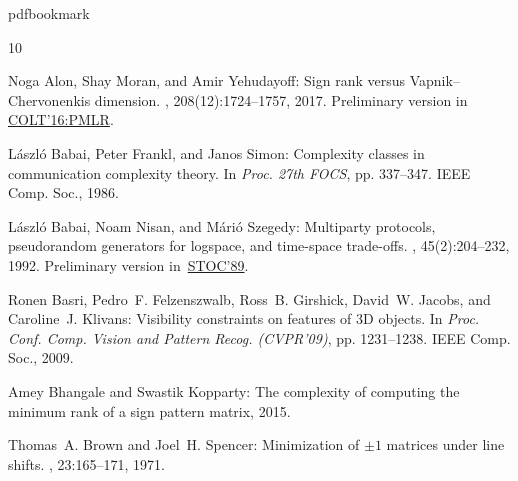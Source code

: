 \newcommand{\prelim}{Preliminary version in\ }\newcommand{\prelims}{Preliminary
  versions in\ }
\providecommand{\bibhead}[1]{}
\expandafter\ifx\csname pdfbookmark\endcsname\relax%
  \providecommand{\tocrefpdfbookmark}{}
\else\providecommand{\tocrefpdfbookmark}{%
   \hypertarget{tocreferences}{}%
   \pdfbookmark[1]{References}{tocreferences}}%
\fi

\tocrefpdfbookmark
\begin{thebibliography}{10}

\bibhead{alon2016sign}
{\sc Noga Alon, Shay Moran, and Amir Yehudayoff}: Sign rank versus
  {V}apnik--{C}hervonenkis dimension.
, 208(12):1724--1757, 2017.
\newblock \prelim
  \href{http://proceedings.mlr.press/v49/alon16.html}{COLT'16:PMLR}.
\newblock [\epfmtdoi{10.1070/SM8780}]

\bibhead{babai1986complexity}
{\sc L{\'a}szl{\'o} Babai, Peter Frankl, and Janos Simon}: Complexity classes
  in communication complexity theory.
\newblock In {\em Proc. 27th FOCS}, pp. 337--347. IEEE Comp. Soc., 1986.

\bibhead{babai1992multiparty}
{\sc L{\'a}szl{\'o} Babai, Noam Nisan, and M{\'a}ri{\'o} Szegedy}: Multiparty
  protocols, pseudorandom generators for logspace, and time-space trade-offs.
, 45(2):204--232, 1992.
\newblock \prelim \href{https://doi.org/10.1145/73007.73008}{STOC'89}.

\bibhead{basri2009visibility}
{\sc Ronen Basri, Pedro~F. Felzenszwalb, Ross~B. Girshick, David~W. Jacobs, and
  Caroline~J. Klivans}: Visibility constraints on features of {3D} objects.
\newblock In {\em Proc. Conf. Comp. Vision and Pattern Recog. (CVPR'09)}, pp.
  1231--1238. IEEE Comp. Soc., 2009.

\bibhead{bhangale2015complexity}
{\sc Amey Bhangale and Swastik Kopparty}: The complexity of computing the
  minimum rank of a sign pattern matrix, 2015.

\bibhead{switching-game}
{\sc Thomas~A. Brown and Joel~H. Spencer}: Minimization of $\pm 1$ matrices
  under line shifts.
, 23:165--171, 1971.
\newblock [\epfmtdoi{10.4064/cm-23-1-165-171}]


\end{thebibliography}
